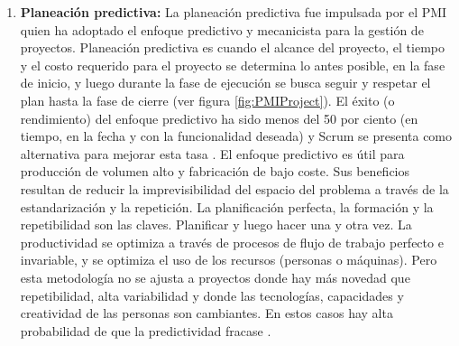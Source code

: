 \begin{enumerate}

\item \textbf{Planeación predictiva:} La planeación predictiva fue impulsada por el PMI quien ha adoptado el enfoque predictivo y mecanicista para la gestión de proyectos. Planeación predictiva es cuando el alcance del proyecto, el tiempo y el costo requerido para el proyecto se determina lo antes posible, en la fase de inicio, y luego durante la fase de ejecución se busca seguir y respetar el plan hasta la fase de cierre (ver figura \ref{fig:PMIProject}). El éxito (o rendimiento) del enfoque predictivo ha sido menos del 50 por ciento (en tiempo, en la fecha y con la funcionalidad deseada) y Scrum se presenta como alternativa para mejorar esta tasa \cite{Ken-Schwaber-2011}. El enfoque predictivo es útil para producción de volumen alto y fabricación de bajo coste. Sus beneficios resultan de reducir la imprevisibilidad del espacio del problema a través de la estandarización y la repetición. La planificación perfecta, la formación y la repetibilidad son las claves. Planificar y luego hacer una y otra vez. La productividad se optimiza a través de procesos de flujo de trabajo perfecto e invariable, y se optimiza el uso de los recursos (personas o máquinas). Pero esta metodología no se ajusta a proyectos donde hay más novedad que repetibilidad, alta variabilidad y donde las tecnologías, capacidades y creatividad de las personas son cambiantes. En estos casos hay alta probabilidad de que la predictividad fracase \cite{Ken-Schwaber-2011}.


\end{enumerate}

